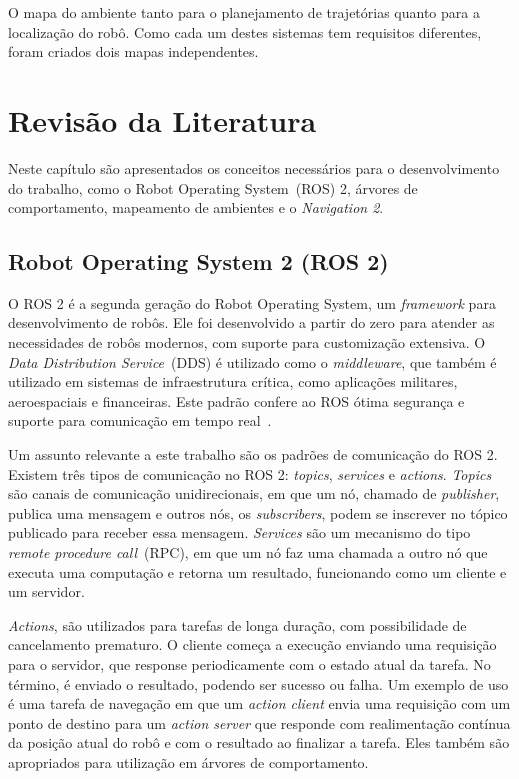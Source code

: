 \documentclass[repeatfields,xlists,xpacks,oneside,yearsonly]{ufrgscca}
\begin{document}
O mapa do ambiente tanto para o planejamento de trajetórias quanto
para a localização do robô. Como cada um destes sistemas tem
requisitos diferentes, foram criados dois mapas independentes.

\chapter{Revisão da Literatura}
\label{revisao}

Neste capítulo são apresentados os conceitos necessários para o
desenvolvimento do trabalho, como o Robot Operating System~(ROS) 2,
árvores de comportamento, mapeamento de ambientes e o
\textit{Navigation 2}.

\section{Robot Operating System 2 (ROS 2)}

O ROS 2 é a segunda geração do Robot Operating System, um
\textit{framework} para desenvolvimento de robôs. Ele foi
desenvolvido a partir do zero para atender as necessidades de robôs
modernos, com suporte para customização extensiva. O \textit{Data
    Distribution Service}~(DDS) é utilizado como o \textit{middleware},
que também é utilizado em sistemas de infraestrutura crítica, como
aplicações militares, aeroespaciais e financeiras. Este padrão
confere ao ROS ótima segurança e suporte para comunicação em tempo
real~\cite{ROS2Article}.

Um assunto relevante a este trabalho são os padrões de comunicação do
ROS 2. Existem três tipos de comunicação no ROS 2: \textit{topics},
\textit{services} e \textit{actions}. \textit{Topics} são canais de
comunicação unidirecionais, em que um nó, chamado de
\textit{publisher}, publica uma mensagem e outros nós, os
\textit{subscribers}, podem se inscrever no tópico publicado para
receber essa mensagem. \textit{Services} são um mecanismo do tipo
\textit{remote procedure call}~(RPC), em que um nó faz uma chamada a
outro nó que executa uma computação e retorna um resultado,
funcionando como um cliente e um servidor.

\textit{Actions}, são utilizados para tarefas de longa duração, com possibilidade de
cancelamento prematuro.
O cliente começa a execução enviando uma requisição para o servidor,
que response periodicamente com o estado atual da tarefa.
No término, é enviado o resultado, podendo ser sucesso ou falha.
Um exemplo de uso é uma tarefa de navegação em que um \textit{action client}
envia uma requisição com um ponto de destino para um \textit{action server}
que responde com realimentação contínua da posição atual do robô e
com o resultado ao finalizar a tarefa.
Eles também são apropriados para utilização em árvores de comportamento.
\end{document}
